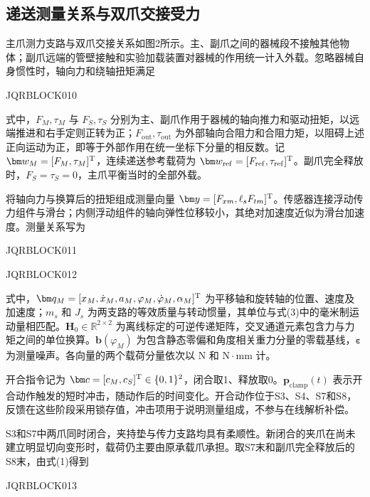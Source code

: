 \subsection{递送测量关系与双爪交接受力}


主爪测力支路与双爪交接关系如图2所示。主、副爪之间的器械段不接触其他物体；副爪远端的管壁接触和实验加载装置对器械的作用统一计入外载。忽略器械自身惯性时，轴向力和绕轴扭矩满足


JQRBLOCK010


式中，$F_M,\tau_M$ 与 $F_S,\tau_S$ 分别为主、副爪作用于器械的轴向推力和驱动扭矩，以远端推进和右手定则正转为正；$F_{\mathrm{out}},\tau_{\mathrm{out}}$ 为外部轴向合阻力和合阻力矩，以阻碍上述正向运动为正，即等于外部作用在统一坐标下分量的相反数。记 $\bm w_M=[F_M,\tau_M]^{\rm T}$，连续递送参考载荷为 $\bm w_{\mathrm{ref}}=[F_{\mathrm{ref}},\tau_{\mathrm{ref}}]^{\rm T}$。副爪完全释放时，$F_S=\tau_S=0$，主爪平衡当时的全部外载。





将轴向力与换算后的扭矩组成测量向量 $\bm y=[F_{xm},\ell_sF_{tm}]^{\rm T}$。传感器连接浮动传力组件与滑台；内侧浮动组件的轴向弹性位移较小，其绝对加速度近似为滑台加速度。测量关系写为


JQRBLOCK011



JQRBLOCK012


式中，$\bm q_M=[x_M,\dot x_M,a_M,\varphi_M,\dot\varphi_M,\alpha_M]^{\rm T}$ 为平移轴和旋转轴的位置、速度及加速度；$m_s$ 和 $J_s$ 为两支路的等效质量与转动惯量，其单位与式(3)中的毫米制运动量相匹配。$\bm H_0\in\mathbb R^{2\times2}$ 为离线标定的可逆传递矩阵，交叉通道元素包含力与力矩之间的单位换算。$\bm b(\varphi_M)$ 为包含静态零偏和角度相关重力分量的零载基线，$\bm\varepsilon$ 为测量噪声。各向量的两个载荷分量依次以 $\mathrm{N}$ 和 $\mathrm{N}\cdot\mathrm{mm}$ 计。





开合指令记为 $\bm c=[c_M,c_S]^{\rm T}\in\{0,1\}^2$，闭合取1、释放取0。$\bm p_{\mathrm{clamp}}(t)$ 表示开合动作触发的短时冲击，随动作后的时间变化。开合动作位于S3、S4、S7和S8，反馈在这些阶段采用锁存值，冲击项用于说明测量组成，不参与在线解析补偿。





S3和S7中两爪同时闭合，夹持垫与传力支路均具有柔顺性。新闭合的夹爪在尚未建立明显切向变形时，载荷仍主要由原承载爪承担。取S7末和副爪完全释放后的S8末，由式(1)得到


JQRBLOCK013


